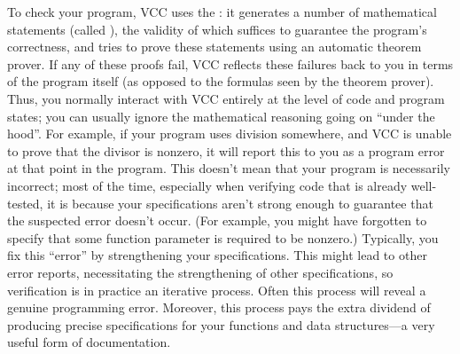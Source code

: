To check your program, VCC uses the :
it generates a number of mathematical
statements (called ), the validity of
which suffices to guarantee the program's correctness, and tries to
prove these statements using an automatic theorem prover. If any of
these proofs fail, VCC reflects these failures back to you in terms of
the program itself (as opposed to the formulas seen by the theorem
prover). Thus, you normally interact with VCC entirely at the level of
code and program states; you can usually ignore the mathematical
reasoning going on ``under the hood''.
For example, if your program uses division
somewhere, and VCC is unable to prove that the divisor is nonzero, it
will report this to you as a program error at that point in the
program. 
This doesn't mean that your program is necessarily incorrect;
most of the time, especially when verifying code that is already well-tested,
it is because your specifications aren't strong
enough to guarantee that the suspected error doesn't occur.
(For example, you might have forgotten to specify that some function
parameter is required to be nonzero.)
Typically, you fix this ``error'' by strengthening your
specifications. This might lead to other error reports, necessitating
the strengthening of other specifications, so verification is in
practice an iterative process.  
Often this process will reveal a genuine programming error.
Moreover, this process pays the extra dividend of producing precise
specifications for your functions and data structures---a very useful
form of documentation. 


